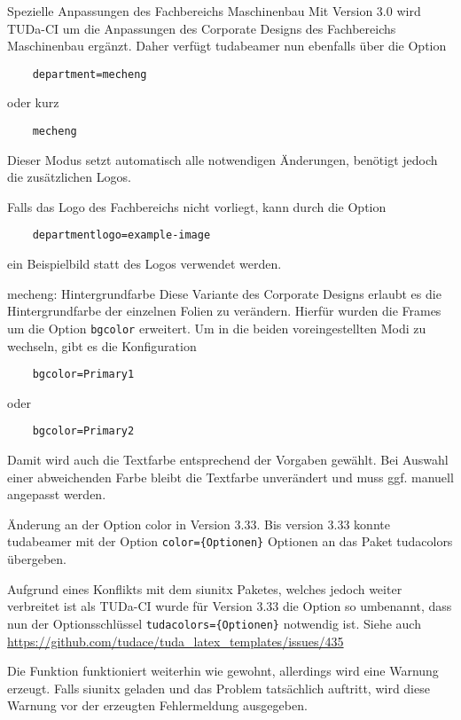 \documentclass[
	ngerman,%
	aspectratio=169,%
	accentcolor=2d,%
	logo=false,%
	colorframetitle=true,%
	design=2008,  %
	]{tudabeamer}
\let\code\texttt
\begin{document}
\begin{frame}[fragile]{Spezielle Anpassungen des Fachbereichs Maschinenbau}
	Mit Version 3.0 wird TUDa-CI um die Anpassungen des Corporate Designs des Fachbereichs Maschinenbau ergänzt.
	Daher verfügt tudabeamer nun ebenfalls über die Option 
	\begin{verbatim}
	department=mecheng
	\end{verbatim}
	oder kurz 
	\begin{verbatim}
	mecheng
	\end{verbatim}
	Dieser Modus setzt automatisch alle notwendigen Änderungen, benötigt jedoch die zusätzlichen Logos.
	
	Falls das Logo des Fachbereichs nicht vorliegt, kann durch die Option
	\begin{verbatim}
	departmentlogo=example-image
	\end{verbatim} ein Beispielbild statt des Logos verwendet werden.
\end{frame}

\begin{frame}[fragile]{mecheng: Hintergrundfarbe}
	Diese Variante des Corporate Designs erlaubt es die Hintergrundfarbe der einzelnen Folien zu verändern. Hierfür wurden die Frames um die Option \code{bgcolor} erweitert. Um in die beiden voreingestellten Modi zu wechseln, gibt es die Konfiguration
	\begin{verbatim}
	bgcolor=Primary1
	\end{verbatim}
	oder
	\begin{verbatim}
	bgcolor=Primary2
	\end{verbatim}
	Damit wird auch die Textfarbe entsprechend der Vorgaben gewählt. Bei Auswahl einer abweichenden Farbe bleibt die Textfarbe unverändert und muss ggf. manuell angepasst werden.
\end{frame}

\begin{frame}[fragile]{Änderung an der Option color in Version 3.33.}
Bis version 3.33 konnte tudabeamer mit der Option \verb+color={Optionen}+ Optionen an das Paket tudacolors übergeben.

Aufgrund eines Konflikts mit dem siunitx Paketes, welches jedoch weiter verbreitet ist als TUDa-CI wurde für Version 3.33 die Option so umbenannt, dass nun der Optionsschlüssel \verb+tudacolors={Optionen}+ notwendig ist.
Siehe auch \url{https://github.com/tudace/tuda_latex_templates/issues/435}

Die Funktion funktioniert weiterhin wie gewohnt, allerdings wird eine Warnung erzeugt. Falls siunitx geladen und das Problem tatsächlich auftritt, wird diese Warnung vor der erzeugten Fehlermeldung ausgegeben.
\end{frame}
\end{document}
